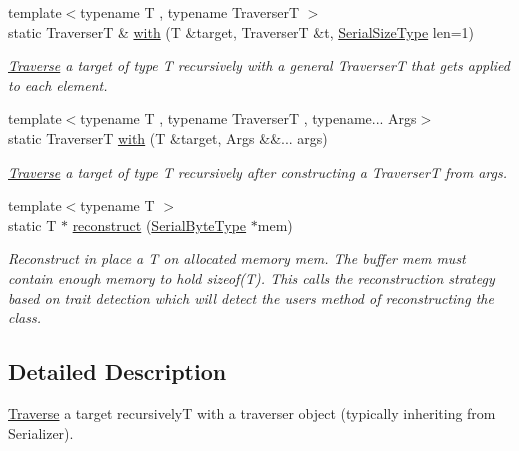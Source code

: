 \begin{DoxyCompactItemize}
\item 
{\footnotesize template$<$typename T , typename TraverserT $>$ }\\static TraverserT \& \hyperlink{structcheckpoint_1_1dispatch_1_1_traverse_a179ea8a80a3cf9a50091b70da785eb83}{with} (T \&target, TraverserT \&t, \hyperlink{namespacecheckpoint_a083f6674da3f94c2901b18c6d238217c}{Serial\+Size\+Type} len=1)
\begin{DoxyCompactList}\small\item\em \hyperlink{structcheckpoint_1_1dispatch_1_1_traverse}{Traverse} a {\ttfamily target} of type {\ttfamily T} recursively with a general {\ttfamily TraverserT} that gets applied to each element. \end{DoxyCompactList}\item 
{\footnotesize template$<$typename T , typename TraverserT , typename... Args$>$ }\\static TraverserT \hyperlink{structcheckpoint_1_1dispatch_1_1_traverse_a52e345aa5da6b8d7866a15993356788c}{with} (T \&target, Args \&\&... args)
\begin{DoxyCompactList}\small\item\em \hyperlink{structcheckpoint_1_1dispatch_1_1_traverse}{Traverse} a {\ttfamily target} of type {\ttfamily T} recursively after constructing a {\ttfamily TraverserT} from {\ttfamily args}. \end{DoxyCompactList}\item 
{\footnotesize template$<$typename T $>$ }\\static T $\ast$ \hyperlink{structcheckpoint_1_1dispatch_1_1_traverse_ad043c9e132aeb99049d0d3ff8df6b876}{reconstruct} (\hyperlink{namespacecheckpoint_ae57f01cdc0b81776c23b6c7c934c58f5}{Serial\+Byte\+Type} $\ast$mem)
\begin{DoxyCompactList}\small\item\em Reconstruct in place a {\ttfamily T} on allocated memory {\ttfamily mem}. The buffer {\ttfamily mem} must contain enough memory to hold {\ttfamily sizeof(\+T)}. This calls the reconstruction strategy based on trait detection which will detect the user\textquotesingle{}s method of reconstructing the class. \end{DoxyCompactList}\end{DoxyCompactItemize}


\subsection{Detailed Description}
\hyperlink{structcheckpoint_1_1dispatch_1_1_traverse}{Traverse} a target recursively{\ttfamily T} with a traverser object (typically inheriting from {\ttfamily Serializer}). 

